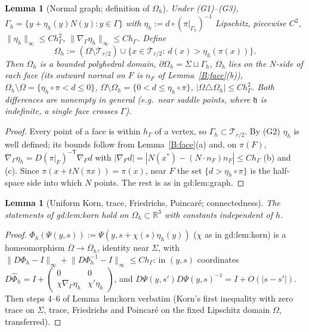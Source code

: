 \documentclass[11pt]{article}
\newtheorem{lemma}[theorem]{Lemma}
\theoremstyle{definition}
\newcommand{\R}{\mathbb R}
\newcommand{\hG}{h_\Gamma}
\newcommand{\Gh}{\Gamma_h}
\newcommand{\Oh}{\Omega_h}
\newcommand{\norm}[1]{\lVert #1\rVert}
\newcommand{\hh}{\mathfrak h}
\begin{document}
\begin{lemma}[Normal graph; definition of $\Oh$]\label{B:graph}
Under (G1)--(G3), $\Gh=\{y+\eta_h(y)N(y):y\in\Gamma\}$ with $\eta_h:=d\circ(\pi|_{\Gh})^{-1}$ Lipschitz, piecewise $C^2$, $\norm{\eta_h}_\infty\le C\hG^2$, $\norm{\nabla_\Gamma\eta_h}_\infty\le C\hG$. Define
\[
\Oh:=(\Omega\setminus\mathcal T_{r/2})\cup\{x\in\mathcal T_{r/2}:\ d(x)>\eta_h(\pi(x))\}.
\]
Then $\Oh$ is a bounded polyhedral domain, $\partial\Oh=\Sigma\sqcup\Gh$, $\Oh$ lies on the $N$-side of each face (its outward normal on $F$ is $n_F$ of Lemma~\ref{B:face}(b)), $\Oh\setminus\Omega=\{\eta_h\circ\pi<d\le0\}$, $\Omega\setminus\Oh=\{0<d\le\eta_h\circ\pi\}$, $|\Omega\triangle\Oh|\le C\hG^2$. Both differences are nonempty in general (e.g.\ near saddle points, where $\hh$ is indefinite, a single face crosses $\Gamma$).
\end{lemma}
\begin{proof}
Every point of a face is within $\hG$ of a vertex, so $\Gh\subset\mathcal T_{r/2}$. By (G2) $\eta_h$ is well defined; its bounds follow from Lemma~\ref{B:face}(a) and, on $\pi(F)$, $\nabla_\Gamma\eta_h=D(\pi|_F)^{-\mathsf T}\nabla_Fd$ with $|\nabla_Fd|=|N(x^\ast)-(N\cdot n_F)n_F|\le C\hG$ (b) and (c). Since $\pi(x+tN(\pi x))=\pi(x)$, near $F$ the set $\{d>\eta_h\circ\pi\}$ is the half-space side into which $N$ points. The rest is as in gd:lem:graph.
\end{proof}

\begin{lemma}[Uniform Korn, trace, Friedrichs, Poincar\'e; connectedness]\label{B:korn}
The statements of gd:lem:korn hold on $\Oh\subset\R^3$ with constants independent of $h$.
\end{lemma}
\begin{proof}
$\Phi_h(\Psi(y,s)):=\Psi(y,s+\chi(s)\eta_h(y))$ ($\chi$ as in gd:lem:korn) is a homeomorphism $\overline\Omega\to\overline\Oh$, identity near $\Sigma$, with $\norm{D\Phi_h-I}_\infty+\norm{D\Phi_h^{-1}-I}_\infty\le C\hG$: in $(y,s)$ coordinates $D\hat\Phi_h=I+\begin{pmatrix}0&0\\\chi\nabla_\Gamma\eta_h&\chi'\eta_h\end{pmatrix}$, and $D\Psi(y,s')D\Psi(y,s)^{-1}=I+O(|s-s'|)$. Then steps 4--6 of Lemma~lem:korn verbatim (Korn's first inequality with zero trace on $\Sigma$, trace, Friedrichs and Poincar\'e on the fixed Lipschitz domain $\Omega$, transferred).
\end{proof}
\end{document}
